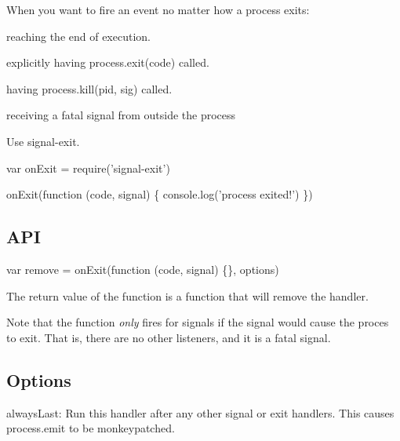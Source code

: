 \href{https://travis-ci.org/tapjs/signal-exit}{\tt } \href{https://coveralls.io/r/tapjs/signal-exit?branch=master}{\tt } \href{https://www.npmjs.com/package/signal-exit}{\tt } \href{https://ci.appveyor.com/project/bcoe/signal-exit}{\tt } \href{https://github.com/conventional-changelog/standard-version}{\tt }

When you want to fire an event no matter how a process exits\+:


\begin{DoxyItemize}
\item reaching the end of execution.
\item explicitly having {\ttfamily process.\+exit(code)} called.
\item having {\ttfamily process.\+kill(pid, sig)} called.
\item receiving a fatal signal from outside the process
\end{DoxyItemize}

Use {\ttfamily signal-\/exit}.


\begin{DoxyCode}
var onExit = require('signal-exit')

onExit(function (code, signal) \{
  console.log('process exited!')
\})
\end{DoxyCode}


\subsection*{A\+PI}

{\ttfamily var remove = on\+Exit(function (code, signal) \{\}, options)}

The return value of the function is a function that will remove the handler.

Note that the function {\itshape only} fires for signals if the signal would cause the proces to exit. That is, there are no other listeners, and it is a fatal signal.

\subsection*{Options}


\begin{DoxyItemize}
\item {\ttfamily always\+Last}\+: Run this handler after any other signal or exit handlers. This causes {\ttfamily process.\+emit} to be monkeypatched. 
\end{DoxyItemize}